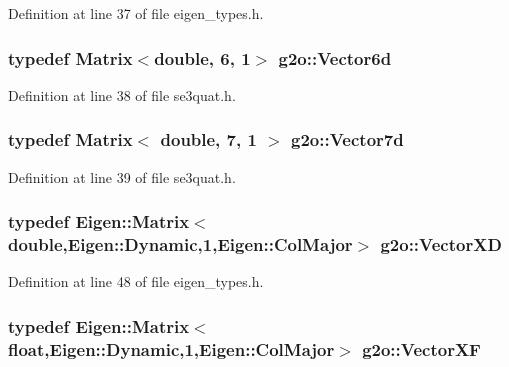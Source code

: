 Definition at line 37 of file eigen\+\_\+types.\+h.

\subsubsection[{\texorpdfstring{Vector6d}{Vector6d}}]{\setlength{\rightskip}{0pt plus 5cm}typedef Matrix$<$double, 6, 1$>$ {\bf g2o\+::\+Vector6d}}\hypertarget{namespaceg2o_a3bc8a4fbac86f158d548be81af2f929b}{}\label{namespaceg2o_a3bc8a4fbac86f158d548be81af2f929b}


Definition at line 38 of file se3quat.\+h.

\subsubsection[{\texorpdfstring{Vector7d}{Vector7d}}]{\setlength{\rightskip}{0pt plus 5cm}typedef Matrix$<$ double, 7, 1 $>$ {\bf g2o\+::\+Vector7d}}\hypertarget{namespaceg2o_a4740ec41130f2ecc628c81f71261c8de}{}\label{namespaceg2o_a4740ec41130f2ecc628c81f71261c8de}


Definition at line 39 of file se3quat.\+h.

\subsubsection[{\texorpdfstring{Vector\+XD}{VectorXD}}]{\setlength{\rightskip}{0pt plus 5cm}typedef Eigen\+::\+Matrix$<$double,Eigen\+::\+Dynamic,1,Eigen\+::\+Col\+Major$>$ {\bf g2o\+::\+Vector\+XD}}\hypertarget{namespaceg2o_ab67b68e8bc395b2085174937de1a634d}{}\label{namespaceg2o_ab67b68e8bc395b2085174937de1a634d}


Definition at line 48 of file eigen\+\_\+types.\+h.

\subsubsection[{\texorpdfstring{Vector\+XF}{VectorXF}}]{\setlength{\rightskip}{0pt plus 5cm}typedef Eigen\+::\+Matrix$<$float,Eigen\+::\+Dynamic,1,Eigen\+::\+Col\+Major$>$ {\bf g2o\+::\+Vector\+XF}}\hypertarget{namespaceg2o_a79143ea34679a74ee7ab02342b3a21df}{}\label{namespaceg2o_a79143ea34679a74ee7ab02342b3a21df}


